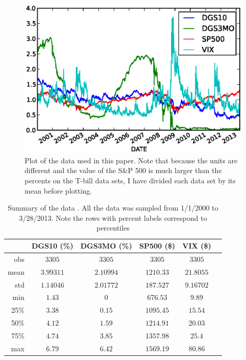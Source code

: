 \documentclass[a4paper, 11pt]{article}
\theoremstyle{definition} %
\numberwithin{equation}{section}
\begin{document}
    \begin{figure}[ht]
        \centering
        \includegraphics[width=6in]{./Figures/all_data.eps}
        \caption{\small Plot of the data used in this paper. Note that because the units are different and the value of the S\&P 500 is much larger than the percents on the T-bill data sets, I have divided each data set by its mean before plotting.}
        \label{fig:alldata}
    \end{figure}

    \begin{table}[ht!]
      \begin{center}
      \label{tab:describe}
        \begin{tabular}{r|ccccc}
        \toprule
           & DGS10  (\%)& DGS3MO  (\%)& SP500 (\$)& VIX (\$)\\
          \midrule
          \midrule
          obs & $3305$ & $3305$ & $3305$ & $3305$\\
          mean & $3.99311$ & $2.10994$ & $1210.33$ & $21.8055$\\
          std & $1.14046$ & $2.01772$ & $187.527$ & $9.16702$\\
          min & $1.43$ & $0$ & $676.53$ & $9.89$\\
          25\% & $3.38$ & $0.15$ & $1095.45$ & $15.54$\\
          50\% & $4.12$ & $1.59$ & $1214.91$ & $20.03$\\
          75\% & $4.74$ & $3.85$ & $1357.98$ & $25.4$\\
          max & $6.79$ & $6.42$ & $1569.19$ & $80.86$\\
        \bottomrule
        \end{tabular}
        \caption{\small Summary of the data . All the data was sampled from 1/1/2000 to 3/28/2013. Note the rows with percent labels correspond to percentiles}
      \end{center}
    \end{table}
\end{document}
